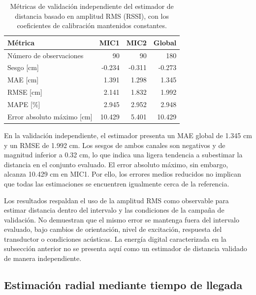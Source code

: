 \begin{table}[htbp]
    \centering
    \caption{
        Métricas de validación independiente del estimador de
        distancia basado en amplitud RMS (RSSI), con los
        coeficientes de calibración mantenidos constantes.
    }
    \label{tab:exp01_rssi_metrics}
    \renewcommand{\arraystretch}{1.15}
    \setlength{\tabcolsep}{7pt}
    \begin{tabular}{lrrr}
        \hline
        \textbf{Métrica} &
        \textbf{MIC1} &
        \textbf{MIC2} &
        \textbf{Global} \\
        \hline
        Número de observaciones & 90 & 90 & 180 \\
        Sesgo [cm] & -0.234 & -0.311 & -0.273 \\
        MAE [cm] & 1.391 & 1.298 & 1.345 \\
        RMSE [cm] & 2.141 & 1.832 & 1.992 \\
        MAPE [\%] & 2.945 & 2.952 & 2.948 \\
        Error absoluto máximo [cm] & 10.429 & 5.401 & 10.429 \\
        \hline
    \end{tabular}
\end{table}

En la validación independiente, el estimador presenta un MAE
global de 1.345 cm y un RMSE de 1.992 cm. Los sesgos de ambos
canales son negativos y de magnitud inferior a 0.32 cm, lo que
indica una ligera tendencia a subestimar la distancia en el
conjunto evaluado. El error absoluto máximo, sin embargo,
alcanza 10.429 cm en MIC1. Por ello, los errores medios reducidos
no implican que todas las estimaciones se encuentren igualmente
cerca de la referencia.

Los resultados respaldan el uso de la amplitud RMS como observable
para estimar distancia dentro del intervalo y las condiciones
de la campaña de validación. No demuestran que el mismo error
se mantenga fuera del intervalo evaluado, bajo cambios de
orientación, nivel de excitación, respuesta del transductor o
condiciones acústicas. La energía digital caracterizada en la
subsección anterior no se presenta aquí como un estimador de
distancia validado de manera independiente.

\subsection{Estimación radial mediante tiempo de llegada}
\label{subsec:exp01_toa}

